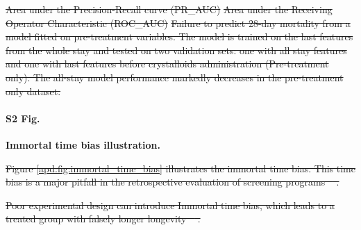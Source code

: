 \documentclass[10pt,letterpaper]{article}
\providecommand{\DIFdeltex}[1]{{\protect\color{red}\sout{#1}}}                      %
\providecommand{\DIFdelbegin}{} %
\providecommand{\DIFdelend}{} %
\providecommand{\DIFdelFL}[1]{\DIFdel{#1}} %
\providecommand{\DIFdel}[1]{\texorpdfstring{\DIFdeltex{#1}}{}} %
\newcommand{\DIFscaledelfig}{0.5}
\newlength{\DIFdelgraphicswidth} %
\newlength{\DIFdelgraphicsheight} %
\newcommand{\DIFdelincludegraphics}[2][]{%
\sbox{\DIFdelgraphicsbox}{\DIFOincludegraphics[#1]{#2}}%
\settoboxwidth{\DIFdelgraphicswidth}{\DIFdelgraphicsbox} %
\settoboxtotalheight{\DIFdelgraphicsheight}{\DIFdelgraphicsbox} %
\scalebox{\DIFscaledelfig}{%
\parbox[b]{\DIFdelgraphicswidth}{\usebox{\DIFdelgraphicsbox}\\[-\baselineskip] \rule{\DIFdelgraphicswidth}{0em}}\llap{\resizebox{\DIFdelgraphicswidth}{\DIFdelgraphicsheight}{%
\setlength{\unitlength}{\DIFdelgraphicswidth}%
\begin{picture}(1,1)%
\thicklines\linethickness{2pt} %
{\color[rgb]{1,0,0}\put(0,0){\framebox(1,1){}}}%
{\color[rgb]{1,0,0}\put(0,0){\line( 1,1){1}}}%
{\color[rgb]{1,0,0}\put(0,1){\line(1,-1){1}}}%
\end{picture}%
}\hspace*{3pt}}} %
} %
\DeclareRobustCommand{\DIFdelbegin}{\DIFOdelbegin \let\includegraphics\DIFdelincludegraphics} %
\DeclareRobustCommand{\DIFdelend}{\DIFOaddend \let\includegraphics\DIFOincludegraphics} %
\begin{document}
{%
  \DIFdelFL{Area under the Precision-Recall curve (PR\_AUC)}}%
{%
  \DIFdelFL{Area under the Receiving Operator Characteristic (ROC\_AUC)}}%
{%
  \DIFdelFL{Failure to predict 28-day mortality from a model fitted on
    pre-treatment variables. The model is trained on the last features from
    the whole stay and tested on two validation sets: one with all stay
    features and one with last features before crystalloids administration
    (Pre-treatment only). The all-stay model performance markedly decreases in
    the pre-treatment only dataset.}}%
\DIFdelend

\paragraph*{S2 Fig.}
\label{apd:immortal_time_bias}
{\bf Immortal time bias illustration.}

\DIFdelbegin \DIFdel{Figure \ref{apd:fig:immortal_time_bias} illustrates the immortal time bias.
  This time bias is a major pitfall in the retrospective evaluation of
  screening programs  \mbox{%
    \cite{bretthauer2013principles}}\hskip0pt%
  .
}%

{%
  \DIFdelFL{Poor experimental design can introduce Immortal time bias, which
    leads to a treated group with falsely longer longevity
    \mbox{%
      \cite{lee2020immortaltimebias}}\hskip0pt%
    .}}%
\end{document}

